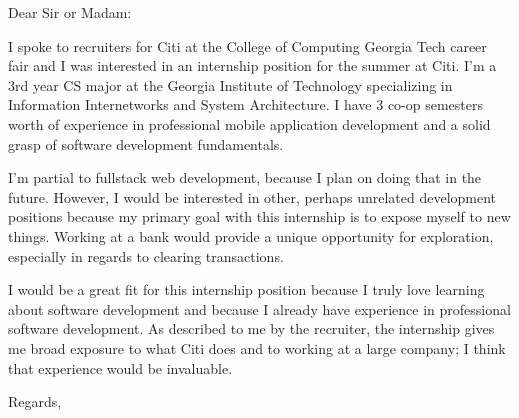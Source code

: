 \documentclass{letter}
\begin{document}
\begin{letter}{}
\opening{Dear Sir or Madam:}

I spoke to recruiters for Citi at the College of Computing Georgia Tech career fair and I was interested in an internship position for the summer at Citi. I'm a 3rd year CS major at the Georgia Institute of Technology specializing in Information Internetworks and System Architecture. I have 3 co-op semesters worth of experience in professional mobile application development and a solid grasp of software development fundamentals. 

I'm partial to fullstack web development, because I plan on doing that in the future. However, I would be interested in other, perhaps unrelated development positions because my primary goal with this internship is to expose myself to new things. Working at a bank would provide a unique opportunity for exploration, especially in regards to clearing transactions.

I would be a great fit for this internship position because I truly love learning about software development and because I already have experience in professional software development.  As described to me by the recruiter, the internship gives me broad exposure to what Citi does and to working at a large company; I think that experience would be invaluable.


\closing{Regards,}
\end{letter}
\end{document}
